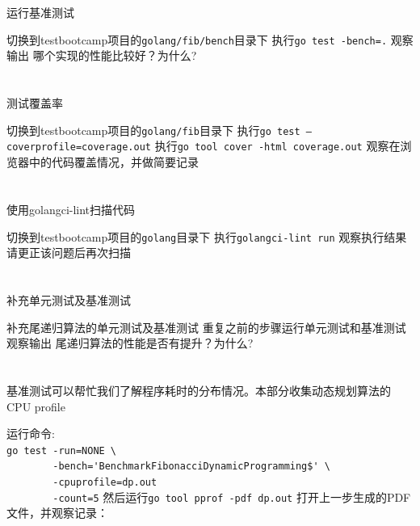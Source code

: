 \documentclass[12pt,addpoints,fleqn]{exam}
\begin{document}
\begin{questions}
\begin{parts}
  \part{}运行基准测试
  \begin{subparts}
    \subpart{}切换到testbootcamp项目的\verb=golang/fib/bench=目录下
    \subpart{}执行\verb#go test -bench=.#
    \subpart{}观察输出
    \fillwithdottedlines{1in}
    \subpart{}哪个实现的性能比较好？为什么?
    \fillwithdottedlines{1in}
  \end{subparts}

  \part{}测试覆盖率
  \begin{subparts}
    \subpart{}切换到testbootcamp项目的\verb=golang/fib=目录下
    \subpart{}执行\verb#go test –coverprofile=coverage.out#
    \subpart{}执行\verb#go tool cover -html coverage.out#
    \subpart{}观察在浏览器中的代码覆盖情况，并做简要记录
    \fillwithdottedlines{1in}
  \end{subparts}

  \part{}使用golangci-lint扫描代码
  \begin{subparts}
    \subpart{}切换到testbootcamp项目的\verb=golang=目录下
    \subpart{}执行\verb#golangci-lint run#
    \subpart{}观察执行结果 \fillwithdottedlines{1in}
    \subpart{}请更正该问题后再次扫描
  \end{subparts}


  \part{}补充单元测试及基准测试
  \begin{subparts}
    \subpart{}补充尾递归算法的单元测试及基准测试
    \subpart{}重复之前的步骤运行单元测试和基准测试
    \subpart{}观察输出
    \fillwithdottedlines{1in}
    \subpart{}尾递归算法的性能是否有提升？为什么?
    \fillwithdottedlines{1in}
  \end{subparts}

  \part{}基准测试可以帮忙我们了解程序耗时的分布情况。本部分收集动态规划算法的CPU profile
  \begin{subparts}
    \subpart{}运行命令: \\
      \verb|go test -run=NONE \| \\
      \verb|        -bench='BenchmarkFibonacciDynamicProgramming$' \| \\
      \verb|        -cpuprofile=dp.out| \\
      \verb|        -count=5|
    \subpart{}然后运行\verb|go tool pprof -pdf dp.out|
    \subpart{}打开上一步生成的PDF文件，并观察记录：
    \fillwithdottedlines{1in}
  \end{subparts}


\end{parts}
\end{questions}
\end{document}
